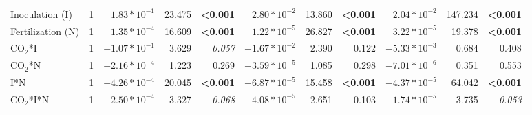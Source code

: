 \begin{landscape}
\begin{table}
{\begin{tabular}{p{3cm}p{0.5cm}p{1.75cm}p{1.5cm}p{1.5cm}p{1.75cm}p{1.5cm}p{1.5cm}p{1.75cm}p{1.5cm}p{1.5cm}}
            Inoculation (I) & \multicolumn{1}{r}{1}
            & \multicolumn{1}{r}{$1.83*10^{-1}$}      & \multicolumn{1}{r}{23.475}        & \multicolumn{1}{r}{\textbf{<0.001}}
            & \multicolumn{1}{r}{$2.80*10^{-2}$}      & \multicolumn{1}{r}{13.860}        & \multicolumn{1}{r}{\textbf{<0.001}}
            & \multicolumn{1}{r}{$2.04*10^{-2}$}      & \multicolumn{1}{r}{147.234}       & \multicolumn{1}{r}{\textbf{<0.001}} 
            \\

            Fertilization (N) & \multicolumn{1}{r}{1}
            & \multicolumn{1}{r}{$1.35*10^{-4}$}      & \multicolumn{1}{r}{16.609}        & \multicolumn{1}{r}{\textbf{<0.001}}
            & \multicolumn{1}{r}{$1.22*10^{-5}$}      & \multicolumn{1}{r}{26.827}        & \multicolumn{1}{r}{\textbf{<0.001}}
            & \multicolumn{1}{r}{$3.22*10^{-5}$}      & \multicolumn{1}{r}{19.378}        & \multicolumn{1}{r}{\textbf{<0.001}} 
            \\

            CO$_2$*I & \multicolumn{1}{r}{1}
            & \multicolumn{1}{r}{$-1.07*10^{-1}$}     & \multicolumn{1}{r}{3.629}         & \multicolumn{1}{r}{\textit{0.057}}
            & \multicolumn{1}{r}{$-1.67*10^{-2}$}     & \multicolumn{1}{r}{2.390}         & \multicolumn{1}{r}{0.122}
            & \multicolumn{1}{r}{$-5.33*10^{-3}$}     & \multicolumn{1}{r}{0.684}         & \multicolumn{1}{r}{0.408} 
            \\

            CO$_2$*N & \multicolumn{1}{r}{1}
            & \multicolumn{1}{r}{$-2.16*10^{-4}$}     & \multicolumn{1}{r}{1.223}         & \multicolumn{1}{r}{0.269}
            & \multicolumn{1}{r}{$-3.59*10^{-5}$}     & \multicolumn{1}{r}{1.085}         & \multicolumn{1}{r}{0.298}
            & \multicolumn{1}{r}{$-7.01*10^{-6}$}     & \multicolumn{1}{r}{0.351}         & \multicolumn{1}{r}{0.553} 
            \\

            I*N & \multicolumn{1}{r}{1}
            & \multicolumn{1}{r}{$-4.26*10^{-4}$}     & \multicolumn{1}{r}{20.045}        & \multicolumn{1}{r}{\textbf{<0.001}}
            & \multicolumn{1}{r}{$-6.87*10^{-5}$}     & \multicolumn{1}{r}{15.458}        & \multicolumn{1}{r}{\textbf{<0.001}}
            & \multicolumn{1}{r}{$-4.37*10^{-5}$}     & \multicolumn{1}{r}{64.042}        & \multicolumn{1}{r}{\textbf{<0.001}} 
            \\

            CO$_2$*I*N & \multicolumn{1}{r}{1}
            & \multicolumn{1}{r}{$2.50*10^{-4}$}      & \multicolumn{1}{r}{3.327}         & \multicolumn{1}{r}{\textit{0.068}}
            & \multicolumn{1}{r}{$4.08*10^{-5}$}      & \multicolumn{1}{r}{2.651}         & \multicolumn{1}{r}{0.103}
            & \multicolumn{1}{r}{$1.74*10^{-5}$}      & \multicolumn{1}{r}{3.735}         & \multicolumn{1}{r}{\textit{0.053}} 
            \\
            \hline


\end{tabular}}
\end{table}
\end{landscape}
